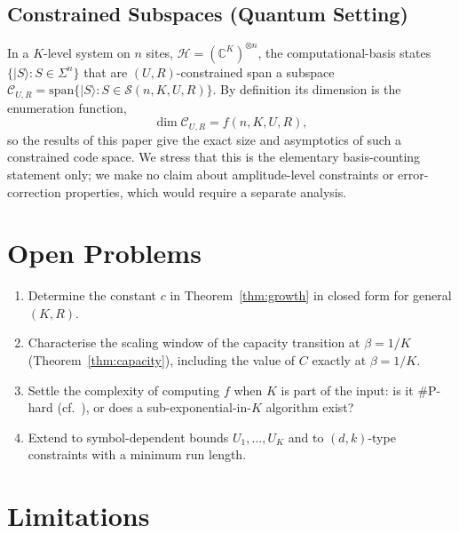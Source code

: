 \documentclass[a4paper,12pt]{article}
\begin{document}
\subsection{Constrained Subspaces (Quantum Setting)}
In a $K$-level system on $n$ sites, $\mathcal H=(\mathbb C^K)^{\otimes
n}$, the computational-basis states $\{|S\rangle : S\in\Sigma^n\}$ that
are $(U,R)$-constrained span a subspace
$\mathcal C_{U,R}=\mathrm{span}\{|S\rangle : S\in\mathcal S(n,K,U,R)\}$.
By definition its dimension is the enumeration function,
\begin{equation}
\dim \mathcal C_{U,R}=f(n,K,U,R),
\end{equation}
so the results of this paper give the exact size and asymptotics of
such a constrained code space. We stress that this is the elementary
basis-counting statement only; we make no claim about amplitude-level
constraints or error-correction properties, which would require a
separate analysis.

\section{Open Problems}
\label{sec:open}

\begin{enumerate}
    \item Determine the constant $c$ in Theorem~\ref{thm:growth} in
          closed form for general $(K,R)$.
    \item Characterise the scaling window of the capacity transition
          at $\beta=1/K$ (Theorem~\ref{thm:capacity}), including the
          value of $C$ exactly at $\beta=1/K$.
    \item Settle the complexity of computing $f$ when $K$ is part of
          the input: is it $\#\mathrm{P}$-hard (cf.~\cite{valiant1979}),
          or does a sub-exponential-in-$K$ algorithm exist?
    \item Extend to symbol-dependent bounds $U_1,\ldots,U_K$ and to
          $(d,k)$-type constraints with a minimum run length.
\end{enumerate}

\section{Limitations}
\end{document}
